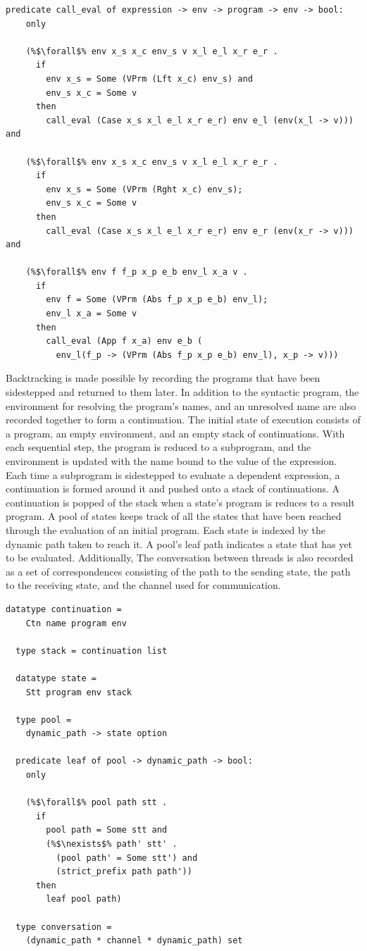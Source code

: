 \documentclass{article}
\begin{document}
\begin{lstlisting}[language=logic, escapechar=\%]
  predicate call_eval of expression -> env -> program -> env -> bool:
    only

    (%$\forall$% env x_s x_c env_s v x_l e_l x_r e_r .
      if
        env x_s = Some (VPrm (Lft x_c) env_s) and
        env_s x_c = Some v
      then
        call_eval (Case x_s x_l e_l x_r e_r) env e_l (env(x_l -> v))) and

    (%$\forall$% env x_s x_c env_s v x_l e_l x_r e_r .
      if 
        env x_s = Some (VPrm (Rght x_c) env_s); 
        env_s x_c = Some v
      then
        call_eval (Case x_s x_l e_l x_r e_r) env e_r (env(x_r -> v))) and

    (%$\forall$% env f f_p x_p e_b env_l x_a v .
      if 
        env f = Some (VPrm (Abs f_p x_p e_b) env_l); 
        env_l x_a = Some v
      then
        call_eval (App f x_a) env e_b (
          env_l(f_p -> (VPrm (Abs f_p x_p e_b) env_l), x_p -> v)))
  \end{lstlisting}
  

Backtracking is made possible by recording the programs that have been sidestepped and
returned to them later. In addition to the syntactic program, the environment for resolving the
program's names, and an unresolved name are also recorded together to form a continuation. 
The initial state of execution consists of a program, an empty environment, and an empty stack
of continuations. With each sequential step, the program is reduced to a subprogram, and the
environment is updated with the name bound to the value of the expression. Each time a
subprogram is sidestepped to evaluate a dependent expression, a continuation is formed around
it and pushed onto a stack of continuations. A continuation is popped of the stack when a
state's program is reduces to a result program.  A pool of states keeps track of all the states
that have been reached through the evaluation of an initial program.  Each state is indexed by
the dynamic path taken to reach it. A pool's leaf path indicates a state that has yet to be
evaluated. Additionally, The conversation between threads is also recorded as a set of
correspondences consisting of the path to the sending state, the path to the receiving state,
and the channel used for communication.  

\begin{lstlisting}[language=logic, escapechar=\%]
  datatype continuation =
    Ctn name program env

  type stack = continuation list

  datatype state =
    Stt program env stack 

  type pool =
    dynamic_path -> state option

  predicate leaf of pool -> dynamic_path -> bool:
    only

    (%$\forall$% pool path stt .
      if
        pool path = Some stt and 
        (%$\nexists$% path' stt' .
          (pool path' = Some stt') and
          (strict_prefix path path'))
      then
        leaf pool path)

  type conversation =
    (dynamic_path * channel * dynamic_path) set
  \end{lstlisting}
\end{document}
